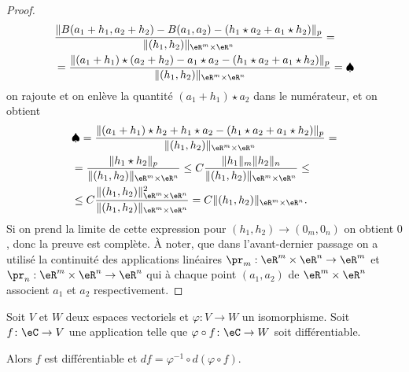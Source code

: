 \begin{proof}
	\begin{equation}
		\begin{aligned}
			 & \frac{\|B(a_1+h_1,a_2+h_2)-B(a_1,a_2)-(h_1\star a_2 + a_1\star h_2)\|_p}{\|(h_1,h_2)\|_{\eR^m\times\eR^n}} =                   \\
			 & = \frac{\|(a_1+h_1)\star(a_2+h_2)-a_1\star a_2-(h_1\star a_2 + a_1\star h_2)\|_p}{\|(h_1,h_2)\|_{\eR^m\times\eR^n}}=\spadesuit
		\end{aligned}
	\end{equation}
	on rajoute et on enlève la quantité \( (a_1+h_1)\star a_2\) dans le numérateur, et on obtient
	\begin{equation}
		\begin{aligned}
			 & \spadesuit= \frac{\|(a_1+h_1)\star h_2+h_1\star a_2-(h_1\star a_2 + a_1\star h_2)\|_p}{\|(h_1,h_2)\|_{\eR^m\times\eR^n}}=          \\
			 & = \frac{\|h_1\star h_2\|_p}{\|(h_1,h_2)\|_{\eR^m\times\eR^n}}\leq C\frac{\|h_1\|_m\|h_2\|_n}{\|(h_1,h_2)\|_{\eR^m\times\eR^n}}\leq \\
			 & \leq C\frac{\|(h_1,h_2)\|^2_{\eR^m\times\eR^n}}{\|(h_1,h_2)\|_{\eR^m\times\eR^n}}= C\|(h_1,h_2)\|_{\eR^m\times\eR^n}.
		\end{aligned}
	\end{equation}
	Si on prend la limite de cette expression pour \( (h_1,h_2)\to (0_m,0_n)\) on obtient \( 0\), donc la preuve est complète. À noter, que dans l'avant-dernier passage on a utilisé la continuité des applications linéaires \( \pr_m:\eR^m\times\eR^n\to \eR^m\) et \( \pr_n: \eR^m\times\eR^n\to \eR^n\) qui à chaque point \( (a_1,a_2)\) de \( \eR^m\times\eR^n\) associent \( a_1\) et \( a_2\) respectivement.
\end{proof}

\begin{proposition}     \label{PropEKLTooSvZjdW}
	Soit \( V\) et \( W\) deux espaces vectoriels et \( \varphi\colon V\to W\) un isomorphisme. Soit \( f\colon \eC\to V\) une application telle que \(\varphi\circ f\colon \eC\to W\) soit différentiable.

	Alors \( f\) est différentiable et \( df=\varphi^{-1}\circ d(\varphi\circ f)\).
\end{proposition}


